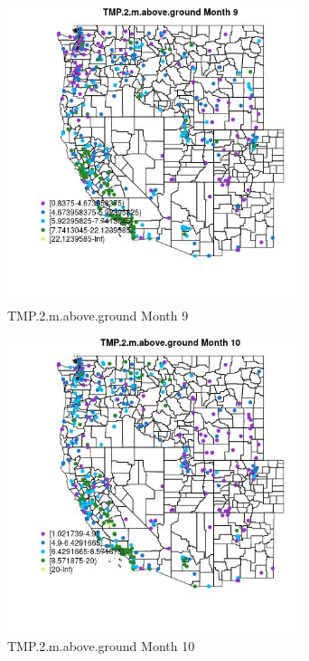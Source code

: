 \begin{figure} 
\centering  
\includegraphics[width=0.77\textwidth]{Code_Outputs/ML_input_report_ML_input_PM25_Step5_part_d_de_duplicated_aves_ML_input_MapObsMo9TMP2maboveground.jpg} 
\caption{\label{fig:ML_input_report_ML_input_PM25_Step5_part_d_de_duplicated_aves_ML_inputMapObsMo9TMP2maboveground}TMP.2.m.above.ground Month 9} 
\end{figure} 
 

\begin{figure} 
\centering  
\includegraphics[width=0.77\textwidth]{Code_Outputs/ML_input_report_ML_input_PM25_Step5_part_d_de_duplicated_aves_ML_input_MapObsMo10TMP2maboveground.jpg} 
\caption{\label{fig:ML_input_report_ML_input_PM25_Step5_part_d_de_duplicated_aves_ML_inputMapObsMo10TMP2maboveground}TMP.2.m.above.ground Month 10} 
\end{figure} 
 

